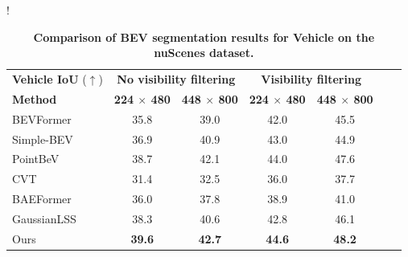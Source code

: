 \begin{table}[t]
    \centering
    \caption{\textbf{Comparison of BEV segmentation results for Vehicle on the nuScenes dataset.}}
    {\setlength{\tabcolsep}{5pt}
    !{%
    \begin{tabular}{lcccccc}
        \toprule
        {\textbf{Vehicle IoU} ($\uparrow$)} & \multicolumn{2}{c}{\textbf{No visibility filtering}} & \multicolumn{2}{c}{\textbf{Visibility filtering}} \\
        \textbf{Method} & \textbf{224 $\times$ 480} & \textbf{448 $\times$ 800} & \textbf{224 $\times$ 480} & \textbf{448 $\times$ 800} \\
        \hline
        BEVFormer \cite{li2024bevformer} & 35.8 & 39.0 & 42.0 & 45.5 \\
        Simple-BEV \cite{harley2023simple} & 36.9 & 40.9 & 43.0 & 44.9 \\
        PointBeV \cite{chambon2024pointbev} & 38.7 & 42.1 & 44.0 & 47.6 \\
        CVT \cite{zhou2022cross} & 31.4 & 32.5 & 36.0 & 37.7 \\
        BAEFormer \cite{pan2023baeformer} & 36.0 & 37.8 & 38.9 & 41.0 \\
        GaussianLSS \cite{lu2025toward} & 38.3 & 40.6 & 42.8 & 46.1 \\
        Ours & \textbf{39.6} & \textbf{42.7} & \textbf{44.6} & \textbf{48.2} \\
        \bottomrule
    \end{tabular}}
    }
\label{tab:vehicle_segmentation}
\end{table}